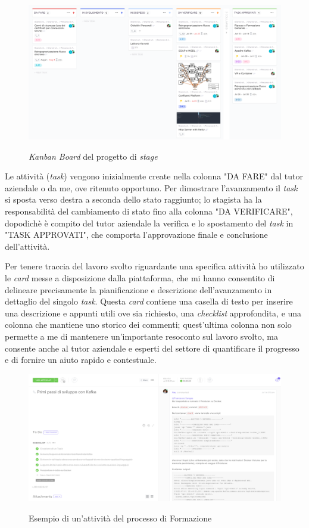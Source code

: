 \bigskip
\begin{figure}[h]
  \includegraphics[width=\textwidth]{images/clickup_board_v2.png}\\
  \caption{\textit{Kanban Board} del progetto di \textit{stage}}
\end{figure}

Le attività (\textit{task}) vengono inizialmente create nella colonna "DA FARE" dal tutor aziendale o da me, ove ritenuto opportuno.
Per dimostrare l'avanzamento il \textit{task} si sposta verso destra a seconda dello stato raggiunto; lo stagista ha la responsabilità del cambiamento di stato fino alla colonna "DA VERIFICARE", dopodichè è compito del tutor aziendale la verifica e lo spostamento del \textit{task} in "TASK APPROVATI", che comporta l'approvazione finale e conclusione dell'attività.

Per tenere traccia del lavoro svolto riguardante una specifica attività ho utilizzato le \textit{card} messe a disposizione dalla piattaforma, che mi hanno consentito di delineare precisamente la pianificazione e descrizione dell'avanzamento in dettaglio del singolo \textit{task}.
Questa \textit{card} contiene una casella di testo per inserire una descrizione e appunti utili ove sia richiesto, una \textit{checklist} approfondita, e una colonna che mantiene uno storico dei commenti; quest'ultima colonna non solo permette a me di mantenere un'importante resoconto sul lavoro svolto, ma consente anche al tutor aziendale e esperti del settore di quantificare il progresso e di fornire un aiuto rapido e contestuale.

\begin{figure}[H]
  \includegraphics[width=\textwidth]{images/clickup_task_v2.png}\\
  \caption{Esempio di un'attività del processo di Formazione}
\end{figure}


